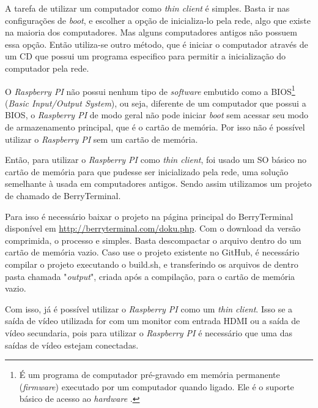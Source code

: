 \documentclass[
	12pt,				%
	openright,			%
	twoside,			%
	a4paper,			%
	chapter=TITLE,		%
	english,			%
	brazil				%
	]{abntex2}
\begin{document}
A tarefa de utilizar um computador como \textit{thin client} é simples. Basta ir nas configurações de \textit{boot}, e escolher a opção de inicializa-lo pela rede, algo que existe na maioria dos computadores. Mas alguns computadores antigos não possuem essa opção. Então utiliza-se outro método, que é iniciar o computador através de um CD que possui um programa especifico para permitir a inicialização do computador pela rede.

O \textit{Raspberry PI} não possui nenhum tipo de \textit{software} embutido como a BIOS\footnote{É um programa de computador pré-gravado em memória permanente (\textit{firmware}) executado por um computador quando ligado. Ele é o suporte básico de acesso ao \textit{hardware} \cite{bios}.} (\textit{Basic Input/Output System}), ou seja, diferente de um computador que possui a BIOS, o \textit{Raspberry PI} de modo geral não pode iniciar \textit{boot} sem acessar seu modo de armazenamento principal, que é o cartão de memória. Por isso não é possível utilizar o \textit{Raspberry PI} sem um cartão de memória.

Então, para utilizar o \textit{Raspberry PI} como \textit{thin client}, foi usado um SO básico no cartão de memória para que pudesse ser inicializado pela rede, uma solução semelhante à usada em computadores antigos. Sendo assim utilizamos um projeto de chamado de BerryTerminal. 
	
Para isso é necessário baixar o projeto na página principal do BerryTerminal  disponível em \url{http://berryterminal.com/doku.php}. Com o download da versão comprimida, o processo e simples. Basta descompactar o arquivo dentro do um cartão de memória vazio. Caso use o projeto existente no GitHub, é necessário compilar o projeto executando o build.sh, e transferindo os arquivos de dentro pasta chamada "\textit{output}", criada após a compilação, para o cartão de memória vazio.

Com isso, já é possível utilizar o \textit{Raspberry PI} como um \textit{thin client}. Isso se a saída de vídeo utilizada for com um monitor com entrada HDMI ou a saída de vídeo secundaria, pois para utilizar o \textit{Raspberry PI} é necessário que uma das saídas de vídeo estejam conectadas.
\end{document}
